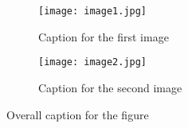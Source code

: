\documentclass{article}
\begin{document}
\begin{figure}[htbp]
    \centering
    \begin{subfigure}{0.45\textwidth}
        \centering
        \texttt{[image: image1.jpg]}
        \caption{Caption for the first image}
    \end{subfigure}
\hfill
    \begin{subfigure}{0.45\textwidth}
        \centering
        \texttt{[image: image2.jpg]}
        \caption{Caption for the second image}
    \end{subfigure}
    \caption{Overall caption for the figure}
\end{figure}
\end{document}
